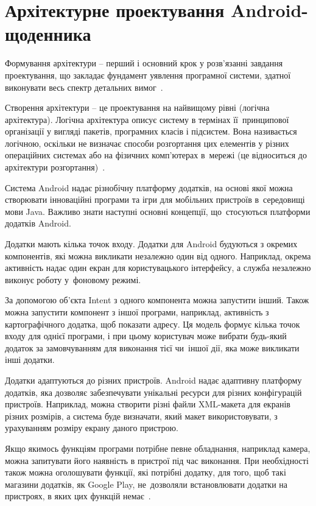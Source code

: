 \documentclass[../main.tex]{subfiles}
\begin{document}
\section{Архітектурне проектування Android-щоденника}
Формування архітектури – перший і основний крок у розв’язанні завдання проектування, що закладає фундамент уявлення програмної системи, здатної виконувати весь спектр детальних вимог~\cite{diploma_guidelines2}.

Створення архітектури – це проектування на найвищому рівні (логічна архітектура). Логічна архітектура описує систему в термінах її~принципової організації у вигляді пакетів, програмних класів і підсистем. Вона називається логічною, оскільки не визначає способи розгортання цих елементів у різних операційних системах або на фізичних комп’ютерах в~мережі (це відноситься до архітектури розгортання)~\cite{diploma_guidelines}.

Система Android надає різнобічну платформу додатків, на основі якої можна створювати інноваційні програми та ігри для мобільних пристроїв в~середовищі мови Java. Важливо знати наступні основні концепції, що~стосуються платформи додатків Android.

Додатки мають кілька точок входу.
Додатки для Android будуються з окремих компонентів, які можна викликати незалежно один від одного. Наприклад, окрема активність надає один екран для користувацького інтерфейсу, а служба незалежно виконує роботу у~фоновому режимі.

За допомогою об'єкта Intent з одного компонента можна запустити інший. Також можна запустити компонент з іншої програми, наприклад, активність з картографічного додатка, щоб показати адресу. Ця модель формує кілька точок входу для однієї програми, і при цьому користувач може вибрати будь-який додаток за замовчуванням для виконання тієї чи~іншої дії, яка може викликати інші додатки.

Додатки адаптуються до різних пристроїв.
Android надає адаптивну платформу додатків, яка дозволяє забезпечувати унікальні ресурси для різних конфігурацій пристроїв. Наприклад, можна створити різні файли \mbox{XML-макета} для екранів різних розмірів, а система буде визначати, який макет використовувати, з урахуванням розміру екрану даного пристрою.

Якщо якимось функціям програми потрібне певне обладнання, наприклад камера, можна запитувати його наявність в пристрої під час виконання. При необхідності також можна оголошувати функції, які потрібні додатку, для того, щоб такі магазини додатків, як Google Play, не~дозволяли встановлювати додатки на пристроях, в яких цих функцій немає~\cite{android_4}.
\end{document}
